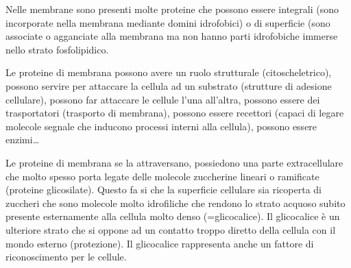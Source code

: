 \documentclass[]{article}
\begin{document}
Nelle membrane sono presenti molte proteine che possono essere integrali
(sono incorporate nella membrana mediante domini idrofobici) o di
superficie (sono associate o agganciate alla membrana ma non hanno parti
idrofobiche immerse nello strato fosfolipidico.

Le proteine di membrana possono avere un ruolo strutturale
(citoscheletrico), possono servire per attaccare la cellula ad un
substrato (strutture di adesione cellulare), possono far attaccare le
cellule l'una all'altra, possono essere dei trasportatori (trasporto di
membrana), possono essere recettori (capaci di legare molecole segnale
che inducono processi interni alla cellula), possono essere
enzimi\ldots{}

Le proteine di membrana se la attraversano, possiedono una parte
extracellulare che molto spesso porta legate delle molecole zuccherine
lineari o ramificate (proteine glicosilate). Questo fa si che la
superficie cellulare sia ricoperta di zuccheri che sono molecole molto
idrofiliche che rendono lo strato acquoso subito presente esternamente
alla cellula molto denso (=glicocalice). Il glicocalice è un ulteriore
strato che si oppone ad un contatto troppo diretto della cellula con il
mondo esterno (protezione). Il glicocalice rappresenta anche un fattore
di riconoscimento per le cellule.
\end{document}
